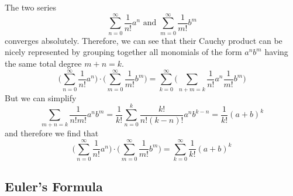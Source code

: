     \begin{example}
      \label{ex:convergence-of-the-cauchy-product-of-absolutely}
    The two series 
    \begin{equation}
      \sum_{n = 0}^\infty \frac{1}{n!} a^n \text{ and } \sum_{m = 0}^\infty \frac{1}{m!} b^m
    \end{equation}
    converges absolutely. Therefore, we can see that their Cauchy product can be nicely represented by grouping together all monomials of the form $a^n b^m$ having the same total degree $m + n = k$. 
    \begin{equation}
      \bigg( \sum_{n = 0}^\infty \frac{1}{n!} a^n \bigg) \cdot \bigg( \sum_{m = 0}^\infty \frac{1}{m!} b^m \bigg) = \sum_{k=0}^\infty \bigg(\sum_{n+m=k} \frac{1}{n!} a^n \frac{1}{m!} b^m \bigg)
    \end{equation}
    But we can simplify 
    \begin{equation}
      \sum_{m + n = k} \frac{1}{n! m!} a^n b^m = \frac{1}{k!} \sum_{n=0}^k \frac{k!}{n! (k-n)!} a^n b^{k-n} = \frac{1}{k!} (a + b)^k
    \end{equation}
    and therefore we find that 
    \begin{equation}
      \bigg( \sum_{n = 0}^\infty \frac{1}{n!} a^n \bigg) \cdot \bigg( \sum_{m = 0}^\infty \frac{1}{m!} b^m \bigg) = \sum_{k=0}^\infty \frac{1}{k!} (a + b)^k
    \end{equation}
  \end{example}

    \subsection{Euler's Formula}

